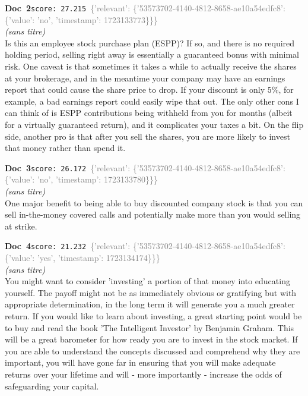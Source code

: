 \documentclass[a4paper,11pt]{article}
\begin{document}
\begin{docenv}
{\footnotesize\textcolor{doccolor}{\textbf{Doc~2}}}\hfill{\tiny\texttt{score:~27.215}}\ {\tiny\textcolor{gray}{\{'relevant': \{'53573702-4140-4812-8658-ae10a54edfc8': \{'value': 'no', 'timestamp': 1723133773\}\}\}}}\\[3pt]
{\small\textit{(sans titre)}}\\[2pt]
\vspace{2pt}
{\footnotesize 
Is this an employee stock purchase plan (ESPP)? If so, and there is no required holding period, selling right away is essentially a guaranteed bonus with minimal risk. One caveat is that sometimes it takes a while to actually receive the shares at your brokerage, and in the meantime your company may have an earnings report that could cause the share price to drop. If your discount is only 5\%, for example, a bad earnings report could easily wipe that out. The only other cons I can think of is ESPP contributions being withheld from you for months (albeit for a virtually guaranteed return), and it complicates your taxes a bit. On the flip side, another pro is that after you sell the shares, you are more likely to invest that money rather than spend it.}
\end{docenv}
\begin{docenv}
{\footnotesize\textcolor{doccolor}{\textbf{Doc~3}}}\hfill{\tiny\texttt{score:~26.172}}\ {\tiny\textcolor{gray}{\{'relevant': \{'53573702-4140-4812-8658-ae10a54edfc8': \{'value': 'no', 'timestamp': 1723133780\}\}\}}}\\[3pt]
{\small\textit{(sans titre)}}\\[2pt]
\vspace{2pt}
{\footnotesize 
One major benefit to being able to buy discounted company stock is that you can sell in-the-money covered calls and potentially make more than you would selling at strike.}
\end{docenv}
\begin{docenv}
{\footnotesize\textcolor{doccolor}{\textbf{Doc~4}}}\hfill{\tiny\texttt{score:~21.232}}\ {\tiny\textcolor{gray}{\{'relevant': \{'53573702-4140-4812-8658-ae10a54edfc8': \{'value': 'yes', 'timestamp': 1723134174\}\}\}}}\\[3pt]
{\small\textit{(sans titre)}}\\[2pt]
\vspace{2pt}
{\footnotesize 
You might want to consider 'investing' a portion of that money into educating yourself. The payoff might not be as immediately obvious or gratifying but with appropriate determination, in the long term it will generate you a much greater return. If you would like to learn about investing, a great starting point would be to buy and read the book 'The Intelligent Investor' by Benjamin Graham. This will be a great barometer for how ready you are to invest in the stock market. If you are able to understand the concepts discussed and comprehend why they are important, you will have gone far in ensuring that you will make adequate returns over your lifetime and will - more importantly - increase the odds of safeguarding your capital.}
\end{docenv}
\end{document}

